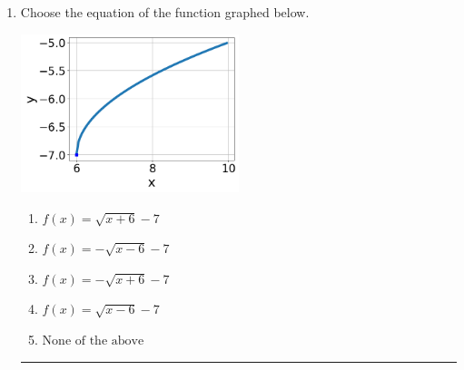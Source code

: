 \documentclass[14pt]{extbook}
\newcommand{\litem}[1]{\item#1\hspace*{-1cm}\rule{\textwidth}{0.4pt}}
\begin{document}
\begin{enumerate}
{\begin{enumerate}[label=\Alph*.]
\end{enumerate} }
\litem{
Choose the equation of the function graphed below.
\begin{center}
    \includegraphics[width=0.5\textwidth]{../Figures/radicalGraphToEquationCopyC.png}
\end{center}
\begin{enumerate}[label=\Alph*.]
\item \( f(x) = \sqrt{x + 6} - 7 \)
\item \( f(x) = - \sqrt{x - 6} - 7 \)
\item \( f(x) = - \sqrt{x + 6} - 7 \)
\item \( f(x) = \sqrt{x - 6} - 7 \)
\item \( \text{None of the above} \)

\end{enumerate} }
\end{enumerate}
\end{document}
